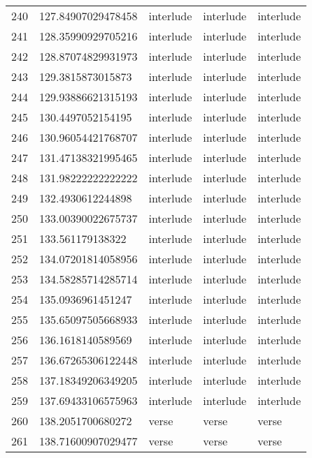 \begin{table}[]
\begin{tabular}{lllll}
    240  & 127.84907029478458 & interlude    & interlude       & interlude      \\
    241  & 128.35990929705216 & interlude    & interlude       & interlude      \\
    242  & 128.87074829931973 & interlude    & interlude       & interlude      \\
    243  & 129.3815873015873  & interlude    & interlude       & interlude      \\
    244  & 129.93886621315193 & interlude    & interlude       & interlude      \\
    245  & 130.4497052154195  & interlude    & interlude       & interlude      \\
    246  & 130.96054421768707 & interlude    & interlude       & interlude      \\
    247  & 131.47138321995465 & interlude    & interlude       & interlude      \\
    248  & 131.98222222222222 & interlude    & interlude       & interlude      \\
    249  & 132.4930612244898  & interlude    & interlude       & interlude      \\
    250  & 133.00390022675737 & interlude    & interlude       & interlude      \\
    251  & 133.561179138322   & interlude    & interlude       & interlude      \\
    252  & 134.07201814058956 & interlude    & interlude       & interlude      \\
    253  & 134.58285714285714 & interlude    & interlude       & interlude      \\
    254  & 135.0936961451247  & interlude    & interlude       & interlude      \\
    255  & 135.65097505668933 & interlude    & interlude       & interlude      \\
    256  & 136.1618140589569  & interlude    & interlude       & interlude      \\
    257  & 136.67265306122448 & interlude    & interlude       & interlude      \\
    258  & 137.18349206349205 & interlude    & interlude       & interlude      \\
    259  & 137.69433106575963 & interlude    & interlude       & interlude      \\
    260  & 138.2051700680272  & verse        & verse           & verse          \\
    261  & 138.71600907029477 & verse        & verse           & verse          \\

\end{tabular}
\end{table}
